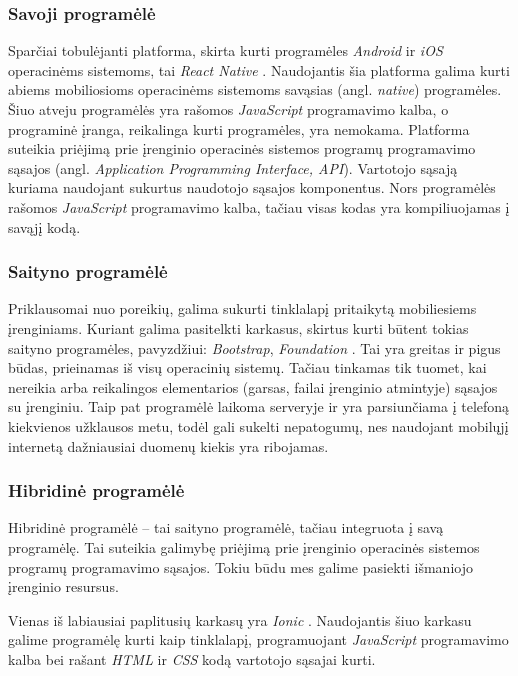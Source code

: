 \documentclass{VUMIFPSkursinis}
\begin{document}
\subsubsection{Savoji programėlė}

Sparčiai tobulėjanti platforma, skirta kurti programėles \textit{Android} ir \textit{iOS} operacinėms sistemoms, tai \textit{React Native} \cite{reactNative}. Naudojantis šia platforma galima kurti abiems mobiliosioms operacinėms sistemoms savąsias (angl. \textit{native}) programėles. Šiuo atveju programėlės yra rašomos \textit{JavaScript} programavimo kalba, o programinė įranga, reikalinga kurti programėles, yra nemokama. Platforma suteikia priėjimą prie įrenginio operacinės sistemos programų programavimo sąsajos (angl. \textit{Application Programming Interface, API}). Vartotojo sąsają kuriama naudojant sukurtus naudotojo sąsajos komponentus. Nors programėlės rašomos \textit{JavaScript} programavimo kalba, tačiau visas kodas yra kompiliuojamas į savąjį kodą.

\subsubsection{Saityno programėlė} \label{webApp}

Priklausomai nuo poreikių, galima sukurti tinklalapį pritaikytą mobiliesiems įrenginiams. Kuriant galima pasitelkti karkasus, skirtus kurti būtent tokias saityno programėles, pavyzdžiui: \textit{Bootstrap}, \textit{Foundation} \cite{cssFrameworks}. Tai yra greitas ir pigus būdas, prieinamas iš visų operacinių sistemų. Tačiau tinkamas tik tuomet, kai nereikia arba reikalingos elementarios (garsas, failai įrenginio atmintyje) sąsajos su įrenginiu. Taip pat programėlė laikoma serveryje ir yra parsiunčiama į telefoną kiekvienos užklausos metu, todėl gali sukelti nepatogumų, nes naudojant mobilųjį internetą dažniausiai duomenų kiekis yra ribojamas.

\subsubsection{Hibridinė programėlė}

Hibridinė programėlė – tai saityno programėlė, tačiau integruota į 	savą programėlę. Tai suteikia galimybę priėjimą prie įrenginio operacinės sistemos programų programavimo sąsajos. Tokiu būdu mes galime pasiekti išmaniojo įrenginio resursus.

Vienas iš labiausiai paplitusių karkasų yra \textit{Ionic} \cite{hybridFrameworks}. Naudojantis šiuo karkasu galime programėlę kurti kaip tinklalapį, programuojant \textit{JavaScript} programavimo kalba bei rašant \textit{HTML} ir \textit{CSS} kodą vartotojo sąsajai kurti.
\end{document}

